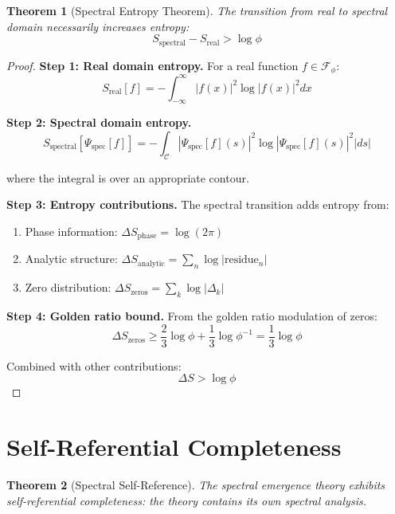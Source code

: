 \documentclass[12pt]{article}
\theoremstyle{plain}
\newtheorem{theorem}{Theorem}[section]
\theoremstyle{definition}
\begin{document}
\begin{theorem}[Spectral Entropy Theorem]
\label{thm:spectral-entropy}
The transition from real to spectral domain necessarily increases entropy:
$$S_{\text{spectral}} - S_{\text{real}} > \log \phi$$
\end{theorem}

\begin{proof}
\textbf{Step 1: Real domain entropy.}
For a real function $f \in \mathcal{F}_\phi$:
$$S_{\text{real}}[f] = -\int_{-\infty}^{\infty} |f(x)|^2 \log|f(x)|^2 dx$$

\textbf{Step 2: Spectral domain entropy.}
$$S_{\text{spectral}}[\Psi_{\text{spec}}[f]] = -\int_{\mathcal{C}} |\Psi_{\text{spec}}[f](s)|^2 \log|\Psi_{\text{spec}}[f](s)|^2 |ds|$$

where the integral is over an appropriate contour.

\textbf{Step 3: Entropy contributions.}
The spectral transition adds entropy from:
\begin{enumerate}
\item Phase information: $\Delta S_{\text{phase}} = \log(2\pi)$
\item Analytic structure: $\Delta S_{\text{analytic}} = \sum_n \log|\text{residue}_n|$
\item Zero distribution: $\Delta S_{\text{zeros}} = \sum_k \log|\Delta_k|$
\end{enumerate}

\textbf{Step 4: Golden ratio bound.}
From the golden ratio modulation of zeros:
$$\Delta S_{\text{zeros}} \geq \frac{2}{3} \log \phi + \frac{1}{3} \log \phi^{-1} = \frac{1}{3} \log \phi$$

Combined with other contributions:
$$\Delta S > \log \phi$$
\end{proof}

\section{Self-Referential Completeness}

\begin{theorem}[Spectral Self-Reference]
The spectral emergence theory exhibits self-referential completeness: the theory contains its own spectral analysis.
\end{theorem}
\end{document}
